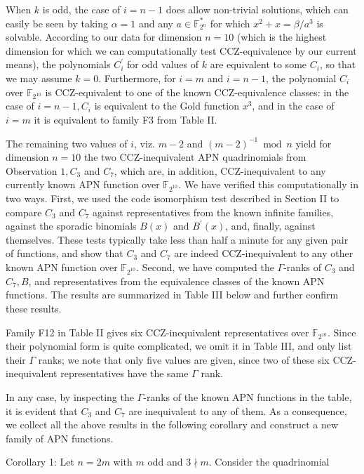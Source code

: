 \documentclass[10pt]{article}
\begin{document}
When $k$ is odd, the case of $i=n-1$ does allow non-trivial solutions, which can easily be seen by taking $\alpha=1$ and any $a \in \mathbb{F}_{2^{n}}^{*}$ for which $x^{2}+x=\beta / a^{3}$ is solvable. According to our data for dimension $n=10$ (which is the highest dimension for which we can computationally test CCZ-equivalence by our current means), the polynomials $C_{i}^{\prime}$ for odd values of $k$ are equivalent to some $C_{i}$, so that we may assume $k=0$. Furthermore, for $i=m$ and $i=n-1$, the polynomial $C_{i}$ over $\mathbb{F}_{2^{10}}$ is CCZ-equivalent to one of the known CCZ-equivalence classes: in the case of $i=n-1, C_{i}$ is equivalent to the Gold function $x^{3}$, and in the case of $i=m$ it is equivalent to family F3 from Table II.

The remaining two values of $i$, viz. $m-2$ and $(m-2)^{-1} \bmod n$ yield for dimension $n=10$ the two CCZ-inequivalent APN quadrinomials from Observation $1, C_{3}$ and $C_{7}$, which are, in addition, CCZ-inequivalent to any currently known APN function over $\mathbb{F}_{2^{10}}$. We have verified this computationally in two ways. First, we used the code isomorphism test described in Section II to compare $C_{3}$ and $C_{7}$ against representatives from the known infinite families, against the sporadic binomials $B(x)$ and $B^{\prime}(x)$, and, finally, against themselves. These tests typically take less than half a minute for any given pair of functions, and show that $C_{3}$ and $C_{7}$ are indeed CCZ-inequivalent to any other known APN function over $\mathbb{F}_{2^{10}}$. Second, we have computed the $\Gamma$-ranks of $C_{3}$ and $C_{7}, B$, and representatives from the equivalence classes of the known APN functions. The results are summarized in Table III below and further confirm these results.

Family F12 in Table II gives six CCZ-inequivalent representatives over $\mathbb{F}_{2^{10}}$. Since their polynomial form is quite complicated, we omit it in Table III, and only list their $\Gamma$ ranks; we note that only five values are given, since two of these six CCZ-inequivalent representatives have the same $\Gamma$ rank.

In any case, by inspecting the $\Gamma$-ranks of the known APN functions in the table, it is evident that $C_{3}$ and $C_{7}$ are inequivalent to any of them. As a consequence, we collect all the above results in the following corollary and construct a new family of APN functions.

Corollary 1: Let $n=2 m$ with $m$ odd and $3 \nmid m$. Consider the quadrinomial
\end{document}
